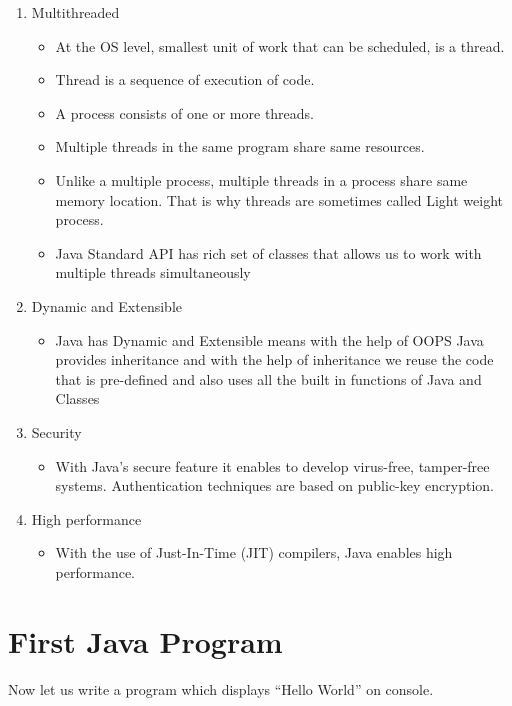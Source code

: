 \documentclass[11pt,a4paper]{article}
\begin{document}
\begin{enumerate}
\begin{itemize}
\end{itemize}
\item Multithreaded
\begin{itemize}
\item At the OS level, smallest unit of work that can be scheduled, is a thread.
\item Thread is a sequence of execution of code.
\item A process consists of one or more threads.
\item Multiple threads in the same program share same resources.
\item Unlike a multiple process, multiple threads in a process share same memory location. That is why threads are sometimes called Light weight process.
\item Java Standard API has rich set of classes that allows us to work with multiple threads simultaneously
\end{itemize}

\item Dynamic and Extensible

\begin{itemize}
\item Java has Dynamic and Extensible means with the help of OOPS Java provides inheritance and with the help of inheritance we reuse the code that is pre-defined and also uses all the built in functions of Java and Classes
\end{itemize}
 
\item Security
\begin{itemize}
 \item With Java's secure feature it enables to develop virus-free, tamper-free systems. Authentication techniques are based on public-key encryption.
\end{itemize}

\item High performance
\begin{itemize}
 \item With the use of Just-In-Time (JIT) compilers, Java enables high performance.
\end{itemize}

\end{enumerate}
\section*{First Java Program}

Now let us write a program which displays ``Hello World'' on console.
\end{document}
